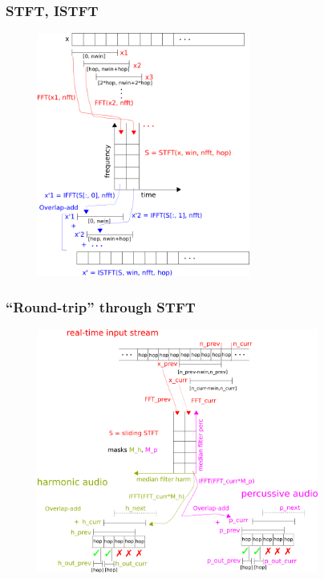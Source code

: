\documentclass{beamer}
\begin{document}
\begin{frame}
	\frametitle{STFT, ISTFT}
	\begin{figure}
	\includegraphics[height=8cm]{../images/stft_diagram.png}
	\end{figure}
\end{frame}

\begin{frame}
	\frametitle{``Round-trip'' through STFT}
	\begin{figure}
	\includegraphics[height=8cm]{../images/rt_hpss_diagram.png}
	\end{figure}
\end{frame}
\end{document}
